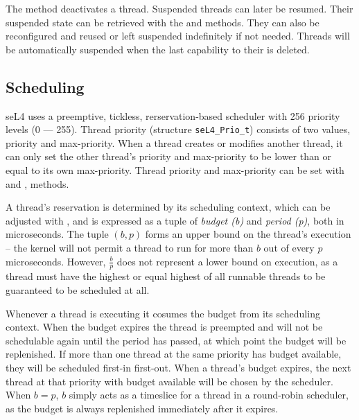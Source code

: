 The  method deactivates a thread.
Suspended threads can later be resumed.
Their suspended state can be retrieved with the 
 and
 methods.
They can also be reconfigured and
reused or left suspended indefinitely if not needed. Threads will be
automatically suspended when the last capability to their  is
deleted.

\subsection{Scheduling}
\label{sec:sched}

seL4 uses a preemptive, tickless, rerservation-based scheduler with 256 priority levels (0 --- 255).
Thread priority (structure \texttt{seL4\_Prio\_t}) consists of two values, priority and max-priority.
When a thread creates or modifies another thread, it can only set the
other thread's priority and max-priority to be lower than or equal to its own max-priority. Thread priority and max-priority can be
set with  and
,  methods.

A thread's reservation is determined by its scheduling context, which can be adjusted with 
, and is expressed as a tuple of 
\textit{budget (b)} and \textit{period (p)}, both in microseconds.
The tuple $(b, p)$ forms an upper bound on the thread's execution -- 
the kernel will not permit a thread to run for more than $b$ out of every $p$ microseconds.
However, $\frac{b}{p}$ does not represent a lower bound on execution, as a thread must have the highest or equal highest of all runnable threads to be guaranteed to be scheduled at all.

Whenever a thread is executing it cosumes the budget from its scheduling context.
When the budget expires the thread is preempted and will not be schedulable again until the period has passed, at which 
point the budget will be replenished.
If more than one thread at the same priority has budget available, they will be scheduled first-in first-out.
When a thread's budget expires, the next thread at that priority with budget available will be chosen by the scheduler.
When $b = p$, $b$ simply acts as a timeslice for a thread in a round-robin scheduler, as the budget is always replenished immediately after it expires.

